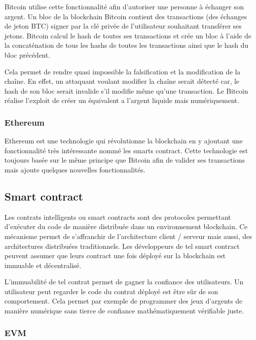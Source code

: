 Bitcoin utilise cette fonctionnalité afin d'autoriser une personne à échanger son argent. Un bloc de la blockchain Bitcoin contient des transactions
(des échanges de jeton BTC) signer par la clé privée de l'utilisateur souhaitant transférer ses jetons. Bitcoin calcul le hash de toutes ses 
transactions et crée un bloc à l'aide de la concaténation de tous les hashs de toutes les transactions ainsi que le hash du bloc précédent.

Cela permet de rendre quasi impossible la falsification et la modification de la chaîne. En effet, un attaquant voulant modifier la chaîne serait
détecté car, le hash de son bloc serait invalide s'il modifie même qu'une transaction. Le Bitcoin réalise l'exploit de créer un équivalent a l'argent
liquide mais numériquement.

\subsubsection{Ethereum}

Ethereum est une technologie qui révolutionne la blockchain en y ajoutant une fonctionnalité très intéressante nommé les smarts contract. Cette
technologie est toujours basée sur le même principe que Bitcoin afin de valider ses transactions mais ajoute quelques nouvelles fonctionnalités.

\subsection{Smart contract}

Les contrats intelligents ou smart contracts sont des protocoles permettant d'exécuter du code de manière distribuée dans un environnement blockchain.
Ce mécanisme permet de s'affranchir de l'architecture client / serveur mais aussi, des architectures distribuées traditionnels. Les développeurs de
tel smart contract peuvent assumer que leurs contract une fois déployé sur la blockchain est immuable et décentralisé.

L'immuabilité de tel contrat permet de gagner la confiance des utilisateurs. Un utilisateur peut regarder le code du contrat déployé est être sûr 
de son comportement. Cela permet par exemple de programmer des jeux d'argents de manière numérique sans tierce de confiance mathématiquement 
vérifiable juste.

\subsubsection{EVM}

